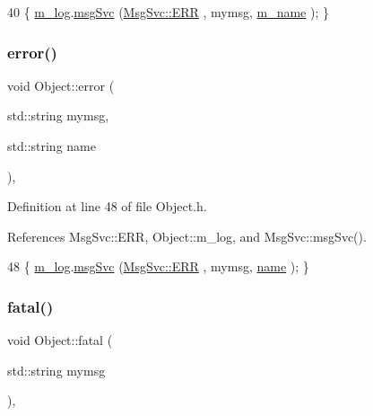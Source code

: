 \begin{DoxyCode}
40 \{ \hyperlink{classObject_a0d269813dd7ac1f24bc143031e2963f2}{m\_log}.\hyperlink{classMsgSvc_ad25f18047920cc59a314e5098259711c}{msgSvc} (\hyperlink{classMsgSvc_ae671eb7301996cd049d2da8a65925926a35a9d7166e9896af4ec8fb33bf5f1772}{MsgSvc::ERR}     , mymsg, \hyperlink{classObject_a8b83c95c705d2c3ba0d081fe1710f48d}{m\_name} ); \}
\end{DoxyCode}
\mbox{\label{classObject_ad7f6c457733082efa2f9ff5f5c8e119a}} 
\subsubsection{\texorpdfstring{error()}{error()}\hspace{0.1cm}{\footnotesize\ttfamily [2/2]}}
{\footnotesize\ttfamily void Object\+::error (\begin{DoxyParamCaption}\item[{std\+::string}]{mymsg,  }\item[{std\+::string}]{name }\end{DoxyParamCaption})\hspace{0.3cm}{\ttfamily [inline]}, {\ttfamily [inherited]}}



Definition at line 48 of file Object.\+h.



References Msg\+Svc\+::\+E\+RR, Object\+::m\+\_\+log, and Msg\+Svc\+::msg\+Svc().


\begin{DoxyCode}
48 \{ \hyperlink{classObject_a0d269813dd7ac1f24bc143031e2963f2}{m\_log}.\hyperlink{classMsgSvc_ad25f18047920cc59a314e5098259711c}{msgSvc} (\hyperlink{classMsgSvc_ae671eb7301996cd049d2da8a65925926a35a9d7166e9896af4ec8fb33bf5f1772}{MsgSvc::ERR}     , mymsg, \hyperlink{classObject_a300f4c05dd468c7bb8b3c968868443c1}{name} ); \}
\end{DoxyCode}
\mbox{\label{classObject_aad5a16aac7516ce65bd5ec02ab07fc80}} 
\subsubsection{\texorpdfstring{fatal()}{fatal()}\hspace{0.1cm}{\footnotesize\ttfamily [1/2]}}
{\footnotesize\ttfamily void Object\+::fatal (\begin{DoxyParamCaption}\item[{std\+::string}]{mymsg }\end{DoxyParamCaption})\hspace{0.3cm}{\ttfamily [inline]}, {\ttfamily [inherited]}}



